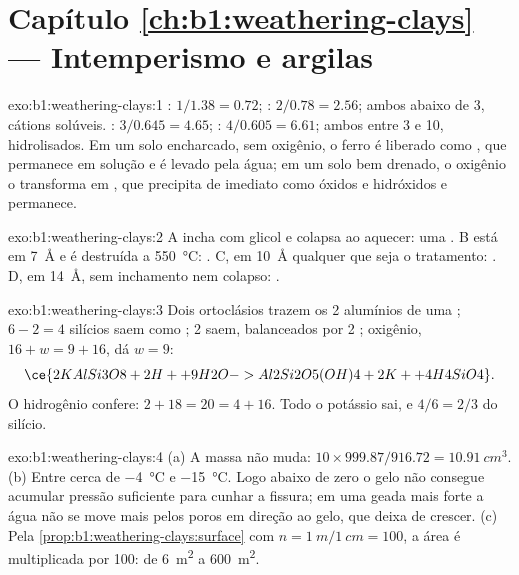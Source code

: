 \section*{Capítulo \ref{ch:b1:weathering-clays} --- Intemperismo e argilas}

\begin{solution}{exo:b1:weathering-clays:1}
: $1/1.38 = 0.72$; : $2/0.78 = 2.56$; ambos abaixo de 3, cátions solúveis. : $3/0.645 = 4.65$; : $4/0.605 = 6.61$; ambos entre 3 e 10, hidrolisados. Em um solo encharcado, sem oxigênio, o ferro é liberado como , que permanece em solução e é levado pela água; em um solo bem drenado, o oxigênio o transforma em , que precipita de imediato como óxidos e hidróxidos e permanece.
\end{solution}

\begin{solution}{exo:b1:weathering-clays:2}
A incha com glicol e colapsa ao aquecer: uma . B está em
\SI{7}{\angstrom} e é destruída a \SI{550}{\celsius}: . C, em \SI{10}{\angstrom} qualquer que seja o tratamento: . D, em \SI{14}{\angstrom}, sem inchamento nem colapso: .
\end{solution}

\begin{solution}{exo:b1:weathering-clays:3}
Dois ortoclásios trazem os 2 alumínios de uma ; $6 - 2 = 4$ silícios saem como ; 2  saem, balanceados por 2 ; oxigênio, $16 + w = 9 + 16$, dá $w = 9$:
\[
  \ce{2 KAlSi3O8 + 2 H+ + 9 H2O -> Al2Si2O5(OH)4 + 2 K+ + 4 H4SiO4}.
\]
O hidrogênio confere: $2 + 18 = 20 = 4 + 16$. Todo o potássio sai, e $4/6 =
2/3$ do silício.
\end{solution}

\begin{solution}{exo:b1:weathering-clays:4}
(a) A massa não muda: $10 \times 999.87/916.72 = \qty{10.91}{cm^3}$.
(b) Entre cerca de \qty{-4}{\celsius} e \qty{-15}{\celsius}. Logo abaixo de zero o gelo não consegue acumular pressão suficiente para cunhar a fissura; em uma geada mais forte a água não se move mais pelos poros em direção ao gelo, que deixa de crescer. (c) Pela
\cref{prop:b1:weathering-clays:surface} com $n = \qty{1}{m}/\qty{1}{cm} = 100$,
a área é multiplicada por 100: de \qty{6}{m^2} a \qty{600}{m^2}.
\end{solution}

